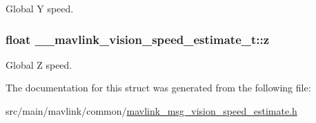 Global Y speed. 

\hypertarget{struct____mavlink__vision__speed__estimate__t_a019d0fa1a28f8c96b0092c9c47ced03d}{
\subsubsection[{z}]{\setlength{\rightskip}{0pt plus 5cm}float \+\_\+\+\_\+mavlink\+\_\+vision\+\_\+speed\+\_\+estimate\+\_\+t\+::z}}\label{struct____mavlink__vision__speed__estimate__t_a019d0fa1a28f8c96b0092c9c47ced03d}


Global Z speed. 



The documentation for this struct was generated from the following file\+:\begin{DoxyCompactItemize}
\item 
src/main/mavlink/common/\hyperlink{mavlink__msg__vision__speed__estimate_8h}{mavlink\+\_\+msg\+\_\+vision\+\_\+speed\+\_\+estimate.\+h}\end{DoxyCompactItemize}
